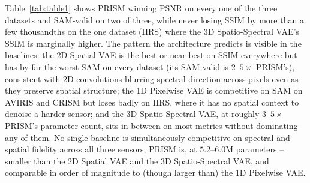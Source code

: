 \documentclass{article} %
\newcommand{\tbd}{--}
\begin{document}
\begin{table}[t]
\centering
\small
\setlength{\tabcolsep}{4.5pt}
\caption{Reconstruction quality on the held-out test split. Best value per dataset and column in bold. SID (spectral information divergence) and SCC (spatial correlation coefficient) are reported alongside PSNR/SSIM/SAM to give a fuller spatial-and-spectral fidelity picture; Q2$^n$ is a combined hypercomplex quality index. Both SID/SCC/Q2$^n$ and Q2$^n$'s comparability depend on each sensor's own band count and are meaningful within a dataset, not across datasets. Cells marked ``\tbd{}'' await a pending re-evaluation pass that had not completed at submission time.}
\label{tab:table1}
\end{table}

Table~\ref{tab:table1} shows PRISM winning PSNR on every one of the three datasets and SAM-valid on two of three, while never losing SSIM by more than a few thousandths on the one dataset (IIRS) where the 3D Spatio-Spectral VAE's SSIM is marginally higher. The pattern the architecture predicts is visible in the baselines: the 2D Spatial VAE is the best or near-best on SSIM everywhere but has by far the worst SAM on every dataset (its SAM-valid is $2$--$5{\times}$ PRISM's), consistent with 2D convolutions blurring spectral direction across pixels even as they preserve spatial structure; the 1D Pixelwise VAE is competitive on SAM on AVIRIS and CRISM but loses badly on IIRS, where it has no spatial context to denoise a harder sensor; and the 3D Spatio-Spectral VAE, at roughly $3$--$5{\times}$ PRISM's parameter count, sits in between on most metrics without dominating any of them. No single baseline is simultaneously competitive on spectral and spatial fidelity across all three sensors; PRISM is, at $5.2$--$6.0$M parameters -- smaller than the 2D Spatial VAE and the 3D Spatio-Spectral VAE, and comparable in order of magnitude to (though larger than) the 1D Pixelwise VAE.
\end{document}
